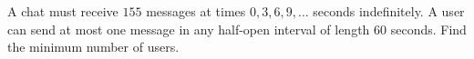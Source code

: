 A chat must receive $155$ messages at times $0,3,6,9,\ldots$ seconds indefinitely. A user can send at most one message in any half-open interval of length $60$ seconds. Find the minimum number of users.
